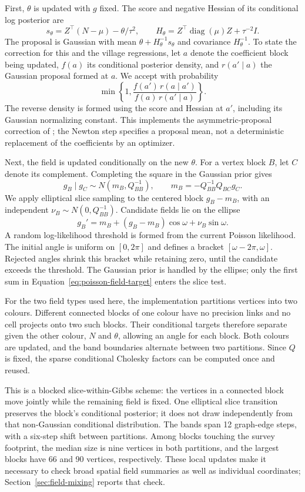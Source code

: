 First, $\theta$ is updated with $g$ fixed. The score and negative Hessian of its conditional log posterior are
\[
 s_\theta=Z^\top(N-\mu)-\theta/\tau^2,
 \qquad
 H_\theta=Z^\top\operatorname{diag}(\mu)Z+\tau^{-2}I.
\]
The proposal is Gaussian with mean $\theta+H_\theta^{-1}s_\theta$ and covariance $H_\theta^{-1}$. To state the correction for this and the village regressions, let $a$ denote the coefficient block being updated, $f(a)$ its conditional posterior density, and $r(a'\mid a)$ the Gaussian proposal formed at $a$. We accept with probability
\begin{equation}\label{eq:regression-acceptance}
 \min\left\{1,
 \frac{f(a')\,r(a\mid a')}{f(a)\,r(a'\mid a)}\right\}.
\end{equation}
The reverse density is formed using the score and Hessian at $a'$, including its Gaussian normalizing constant. This implements the asymmetric-proposal correction of \citet[Section~2.2]{hastings1970}; the Newton step specifies a proposal mean, not a deterministic replacement of the coefficients by an optimizer.

Next, the field is updated conditionally on the new $\theta$. For a vertex block $B$, let $C$ denote its complement. Completing the square in the Gaussian prior gives
\[
 g_B\mid g_C\sim N(m_B,Q_{BB}^{-1}),\qquad
 m_B=-Q_{BB}^{-1}Q_{BC}g_C.
\]
We apply elliptical slice sampling \citep[Section~2 and Figure~2]{murray2010} to the centered block $g_B-m_B$, with an independent $\nu_B\sim N(0,Q_{BB}^{-1})$. Candidate fields lie on the ellipse
\[
 g_B'=m_B+(g_B-m_B)\cos\omega+\nu_B\sin\omega.
\]
A random log-likelihood threshold is formed from the current Poisson likelihood. The initial angle is uniform on $[0,2\pi]$ and defines a bracket $[\omega-2\pi,\omega]$. Rejected angles shrink this bracket while retaining zero, until the candidate exceeds the threshold. The Gaussian prior is handled by the ellipse; only the first sum in Equation~\eqref{eq:poisson-field-target} enters the slice test.

For the two field types used here, the implementation partitions vertices into two colours. Different connected blocks of one colour have no precision links and no cell projects onto two such blocks. Their conditional targets therefore separate given the other colour, $N$ and $\theta$, allowing an angle for each block. Both colours are updated, and the band boundaries alternate between two partitions. Since $Q$ is fixed, the sparse conditional Cholesky factors can be computed once and reused.

This is a blocked slice-within-Gibbs scheme: the vertices in a connected block move jointly while the remaining field is fixed. One elliptical slice transition preserves the block's conditional posterior; it does not draw independently from that non-Gaussian conditional distribution. The bands span 12 graph-edge steps, with a six-step shift between partitions. Among blocks touching the survey footprint, the median size is nine vertices in both partitions, and the largest blocks have 66 and 90 vertices, respectively. These local updates make it necessary to check broad spatial field summaries as well as individual coordinates; Section~\ref{sec:field-mixing} reports that check.

